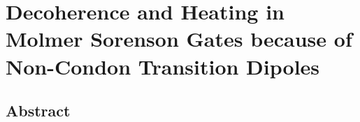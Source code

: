 \chapter{Decoherence and Heating in Molmer Sorenson Gates because of Non-Condon Transition Dipoles}
\thispagestyle{plain}
\vspace{-.5cm}


\section*{Abstract}
    \dsp
    


